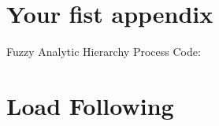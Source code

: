 \documentclass[12pt]{UIdahoMastersThesis}
\begin{document}
\clearpage
\appendix  %

\chapter{Your fist appendix}


Fuzzy Analytic Hierarchy Process Code:





\chapter{Load Following}
\end{document}
